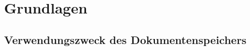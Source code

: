 \documentclass[
    fontsize=12pt,
    headings=small,
    parskip=half,           %
    bibliography=totoc,
    numbers=noenddot,       %
    open=any,               %
    ]{scrreprt}
\begin{document}
%




\chapter{Grundlagen}

    \section{Verwendungszweck des Dokumentenspeichers}
\end{document}
